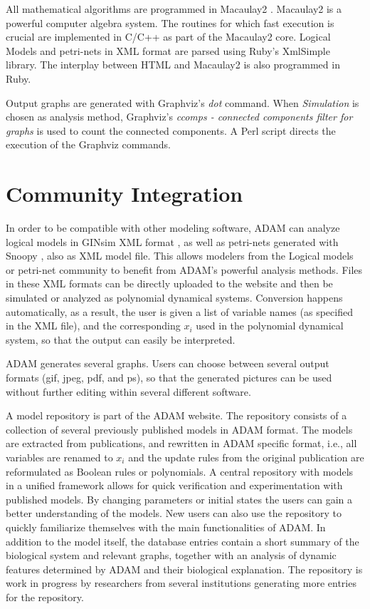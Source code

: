 \documentclass[11pt]{amsart}
\begin{document}
All mathematical algorithms are programmed in Macaulay2 \cite{M2}. Macaulay2 is a powerful computer algebra system. The routines for which fast execution is crucial are implemented in C/C++ as part of the Macaulay2 core. Logical Models and petri-nets in XML format are parsed using Ruby's XmlSimple library. The interplay between HTML and Macaulay2 is also programmed in Ruby.
 
Output graphs are generated with Graphviz's {\it dot} command. When {\it Simulation} is chosen as analysis method, Graphviz's {\it ccomps - connected components filter for graphs} is used to count the connected components. A Perl script directs the execution of the Graphviz commands.
\section{Community Integration}
In order to be compatible with other modeling software, ADAM can analyze logical models in GINsim XML format \cite{GINsim}, as well as petri-nets generated with Snoopy \cite{Snoopy}, also as XML model file. This allows modelers from the Logical models or petri-net community to benefit from ADAM's powerful analysis methods. Files in these XML formats can be directly uploaded to the website and then be simulated or analyzed as polynomial dynamical systems. Conversion happens automatically, as a result, the user is given a list of variable names (as specified in the XML file), and the corresponding $x_i$ used in the polynomial dynamical system, so that the output can easily be interpreted.
 
ADAM generates several graphs. Users can choose between several output formats (gif, jpeg, pdf, and ps), so that the generated pictures can be used without further editing within several different software.
 
A model repository is part of the ADAM website. The repository consists of a collection of several previously published models in ADAM format. The models are extracted from publications, and rewritten in ADAM specific format, i.e., all variables are renamed to $x_i$ and the update rules from the original publication are reformulated as Boolean rules or polynomials. A central repository with models in a unified framework allows for quick verification and experimentation with published models. By changing parameters or initial states the users can gain a better understanding of the models. 
New users can also use the repository to quickly familiarize themselves with the main functionalities of ADAM. In addition to the model itself, the database entries contain a short summary of the biological system and relevant graphs, together with an analysis of dynamic features determined by ADAM and their biological explanation. The repository is work in progress by researchers from several institutions generating more entries for the repository.
 
\end{document}
